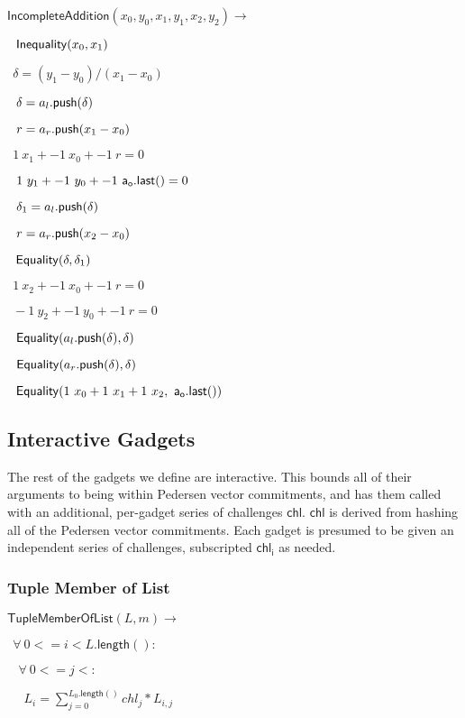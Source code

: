 \documentclass[]{article}
\begin{document}
\newcommand{\incompleteadd}{\mathsf{IncompleteAddition}}

$\incompleteadd(x_0, y_0, x_1, y_1, x_2, y_2) \rightarrow$

$~~\mathsf{Inequality}(x_0, x_1)$

$~~\delta = (y_1 - y_0) / (x_1 - x_0)$

$~~\delta = a_l\mathsf{.push}(\delta)$

$~~r = a_r\mathsf{.push}(x_1 - x_0)$

$~~1 ~x_1 + -1 ~x_0 + -1 ~r = 0$

$~~1 ~y_1 + -1 ~y_0 + -1 ~\mathsf{a_o.last()} = 0$

$~~\delta_1 = a_l\mathsf{.push}(\delta)$

$~~r = a_r\mathsf{.push}(x_2 - x_0)$

$~~\mathsf{Equality}(\delta, \delta_1)$

$~~1 ~x_2 + -1 ~x_0 + -1 ~r = 0$

$~~-1 ~y_2 + -1 ~y_0 + -1 ~r = 0$

$~~\mathsf{Equality}(a_l\mathsf{.push}(\delta), \delta)$

$~~\mathsf{Equality}(a_r\mathsf{.push}(\delta), \delta)$

$~~\mathsf{Equality}(1 ~x_0 + 1 ~x_1 + 1 ~x_2, ~\mathsf{a_o.last()})$

\newpage

\subsection{Interactive Gadgets}

\newcommand{\chl}{\mathsf{chl}}

The rest of the gadgets we define are interactive. This bounds all of their arguments to being within Pedersen vector commitments, and has them called with an additional, per-gadget series of challenges $\chl$. $\chl$ is derived from hashing all of the Pedersen vector commitments. Each gadget is presumed to be given an independent series of challenges, subscripted $\mathsf{chl_i}$ as needed.

\subsubsection{Tuple Member of List}

\newcommand{\tuplememberlist}{\mathsf{TupleMemberOfList}}

$\tuplememberlist(L, m) \rightarrow$

$~~\forall ~0 <= i < L\mathsf{.length}():$

$~~~~\forall ~0 <= j < :$

$~~~~~~L_i = \sum^{L_0\mathsf{.length}()}_{j=0} chl_j * L_{i,j}$
\end{document}
